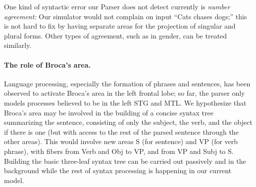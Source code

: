 \documentclass[11pt,a4paper]{article}
\begin{document}
One kind of syntactic error our Parser does not detect currently is {\em number agreement:}  Our simulator would not complain on input ``Cats chases dogs;'' this is not hard to fix by having separate areas for the projection of singular and plural forms.  Other types of agreement, such as in gender, can be treated similarly.    

\paragraph{The role of Broca's area.}  Language processing, especially the formation of phrases and sentences, has been observed to activate Broca's area in the left frontal lobe; so far, the parser only models processes believed to be in the left STG and MTL. We hypothesize that Broca's area may be involved in the building of a concise syntax tree summarizing the sentence, consisting of only the subject, the verb, and the object if there is one (but with access to the rest of the parsed sentence through the other areas).  This would involve new areas {\sc S} (for sentence) and {\sc VP} (for verb phrase), with fibers from {\sc Verb} and {\sc Obj} to {\sc VP}, and from {\sc VP} and {\sc Subj} to {\sc S}.  Building the basic three-leaf syntax tree can be carried out passively and in the background while the rest of syntax processing is happening in our current model.
\end{document}
